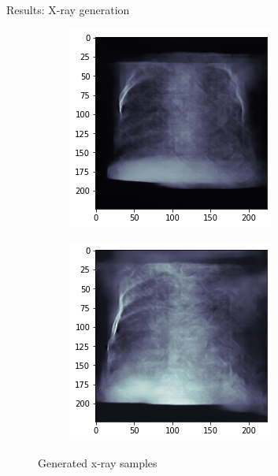 \begin{frame}{Results: X-ray generation}
\begin{figure}[htbp!]
\begin{subfigure}[b]{0.3\textwidth}
     \end{subfigure} 
     \hfill
     \begin{subfigure}[b]{0.3\textwidth}
         \centering
         \includegraphics[width=\textwidth]{Images/xray_sample5.png}
     \end{subfigure}
     \hfill
     \begin{subfigure}[b]{0.3\textwidth}
         \centering
         \includegraphics[width=\textwidth]{Images/xray_sample6.png}
     \end{subfigure}
     \caption{Generated x-ray samples}
\end{figure}
\end{frame}
